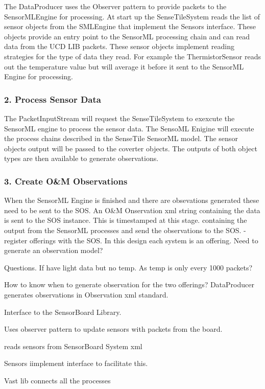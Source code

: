 \documentclass[]{final_report}
\begin{document}
The DataProducer uses the Observer pattern to provide
packets to the SensorMLEngine for processing.
At start up the SenseTileSystem reads the list of sensor objects from the SMLEngine that
implement the Sensors interface. These objects provide an entry point
to the SensorML processing chain and can read data from the UCD LIB packets.
These sensor objects implement reading strategies for the type of data they read. 
For example the ThermistorSensor reads out the temperature value
but will average it before it sent to the SensorML Engine for processing.

\subsubsection {2. Process Sensor Data}
The PacketInputStream will request the SenseTileSystem to exexcute
the SensorML engine to process the sensor data. The SensoML Enigine
will execute the process chains described in the SenseTile SensorML model.
The sensor objects output will be passed to the coverter objects. The
outputs of both object types are then available to generate observations.

\subsubsection {3. Create O\&M Observations}

When the SensorML Engine is finished
and there are obsevations generated these
need to be sent to the SOS. An O\&M Onservation
xml string containing the data is sent to
the SOS instance. This is timestamped at
this stage.
 containing the output from
the SensorML processes and send the observations
to the SOS.
-register offerings with the SOS. In this design
each system is an offering.
Need to generate an observation model?


Questions.
If have light data but no temp. As temp is only
every 1000 packets?

How to know when to generate observation
for the two offerings?
DataProducer generates observations in Observation xml standard.

Interface to the SensorBoard Library.

Uses observer pattern to update sensors with packets from the board.

reads sensors from SensorBoard System xml

Sensors iimplement interface to facilitate this.

Vast lib connects all the processes
\end{document}
